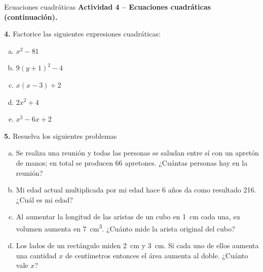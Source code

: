 \documentclass[9pt, aspectratio=169]{beamer}
\begin{document}
\begin{frame}{Ecuaciones cuadráticas}
    \textbf{Actividad 4 -- Ecuaciones cuadráticas (continuación).} \medskip

\textbf{4.} Factorice las siguientes expresiones cuadráticas:
\begin{multicols}{3}
\begin{enumerate}[a)]
    \item $x^2 - 81$
    \item $9(y+1)^2-4$
    \item $x(x-3)+2$
    \item $2x^2+4$
    \item $x^2 - 6x +2$
\end{enumerate}
\end{multicols}

\textbf{5.} Resuelva los siguientes problemas
\begin{enumerate}[a)]
    \item Se realiza una reunión y todas las personas se saludan entre sí con un apretón de manos; en total se producen 66 apretones. ¿Cuántas personas hay en la reunión?
    \item Mi edad actual multiplicada por mi edad hace 6 años da como resultado 216. ¿Cuál es mi edad?
    \item Al aumentar la longitud de las aristas de un cubo en \qty{1}{cm} cada una, su volumen aumenta en \qty{7}{cm^3}. ¿Cuánto mide la arista original del cubo?
\item Los lados de un rectángulo miden \qty{2}{cm} y \qty{3}{cm}. Si cada uno de ellos aumenta una cantidad $x$ de centímetros entonces el área aumenta al doble. ¿Cuánto vale $x$?
\end{enumerate}
\end{frame}
\end{document}
